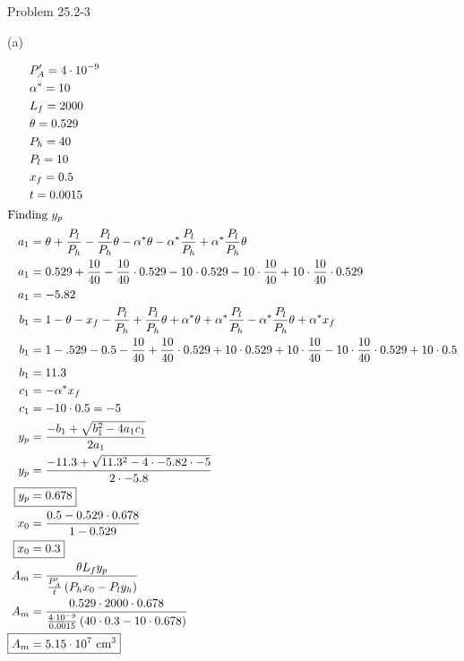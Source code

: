 \item Problem 25.2-3

(a)

\begin{align*}
    & P_A' = 4 \cdot 10^{-9} \\
    & \alpha^* = 10 \\
    & L_f = 2000 \\
    & \theta = 0.529 \\
    & P_h = 40 \\
    & P_l = 10 \\
    & x_f = 0.5 \\
    & t = 0.0015 \\
    \intertext{Finding $y_p$}
    a_1 &= \theta + \frac{P_l}{P_h} - \frac{P_l}{P_h}\theta - \alpha^*\theta - \alpha^*\frac{P_l}{P_h} + \alpha^*\frac{P_l}{P_h}\theta \\ 
    a_1 &= 0.529 + \frac{10}{40} - \frac{10}{40} \cdot 0.529 - 10 \cdot 0.529 - 10 \cdot \frac{10}{40} + 10 \cdot \frac{10}{40} \cdot 0.529 \\
    a_1 &= -5.82 \\
    b_1 &= 1 - \theta - x_f - \frac{P_l}{P_h} + \frac{P_l}{P_h}\theta + \alpha^*\theta + \alpha^*\frac{P_l}{P_h} - \alpha^*\frac{P_l}{P_h}\theta + \alpha^* x_f \\
    b_1 &= 1 - .529 - 0.5 - \frac{10}{40} + \frac{10}{40} \cdot 0.529 + 10 \cdot 0.529 + 10 \cdot \frac{10}{40} - 10 \cdot \frac{10}{40} \cdot 0.529 + 10 \cdot 0.5 \\
    b_1 &= 11.3 \\
    c_1 &= -\alpha^* x_f \\
    c_1 &= -10 \cdot 0.5 = -5 \\
    y_p &= \frac{-b_1 + \sqrt{b_1^2 - 4a_1c_1}}{2a_1} \\
    y_p &= \frac{-11.3 + \sqrt{11.3^2 - 4\cdot-5.82\cdot-5}}{2\cdot-5.8} \\
    \Aboxed{y_p &= 0.678} \\
    x_0 &= \frac{0.5 - 0.529 \cdot 0.678}{1 - 0.529} \\
    \Aboxed{x_0 &= 0.3} \\
    A_m &= \frac{\theta L_f y_p}{\frac{P_A'}{t}\left(P_h x_0 - P_l y_h\right)} \\
    A_m &= \frac{0.529 \cdot 2000 \cdot 0.678}{\frac{4 \cdot 10^{-9}}{0.0015}\left(40 \cdot 0.3 - 10 \cdot 0.678\right)} \\
    \Aboxed{A_m &= 5.15 \cdot 10^7 \text{ cm$^3$}}
\end{align*}

